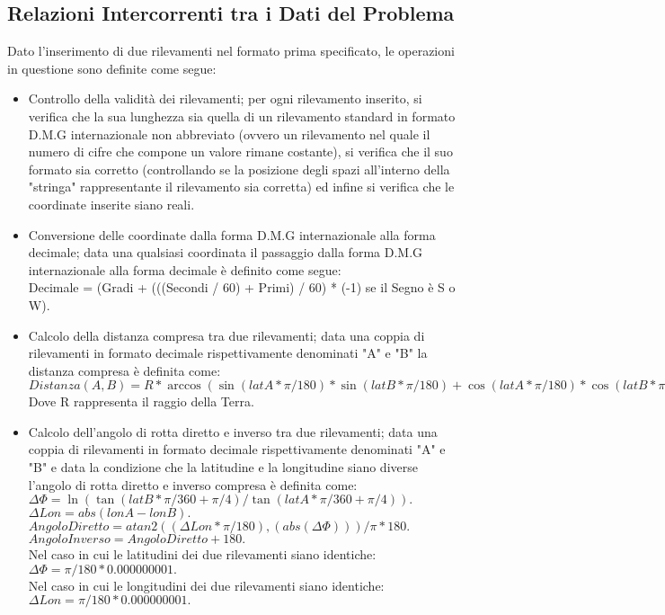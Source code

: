 \documentclass{article}
\begin{document}
\subsection{Relazioni Intercorrenti tra i Dati del Problema}
Dato l'inserimento di due rilevamenti nel formato prima specificato, le operazioni in questione sono definite come segue:
\begin{itemize}
	\item Controllo della validità dei rilevamenti; per ogni rilevamento inserito, si verifica che la sua lunghezza sia quella di un rilevamento standard in formato D.M.G internazionale non abbreviato (ovvero un rilevamento nel quale il numero di cifre che compone un valore rimane costante), si verifica che il suo formato sia corretto (controllando se la posizione degli spazi all'interno della "stringa" rappresentante il rilevamento sia corretta) ed infine si verifica che le coordinate inserite siano reali. 
	
	\item Conversione delle coordinate dalla forma D.M.G internazionale alla forma decimale; data una qualsiasi coordinata il passaggio dalla forma D.M.G internazionale alla forma decimale è definito come segue: \\
	Decimale = (Gradi + (((Secondi / 60) + Primi) / 60) * (-1) se il Segno è  S o W).
	
	\item Calcolo della distanza compresa tra due rilevamenti;  data una coppia di rilevamenti in formato decimale rispettivamente denominati "A" e "B" la distanza compresa è definita come: \\
	$Distanza(A, B) = R * \arccos(\sin(latA * \pi / 180) * \sin(latB * \pi / 180) + \cos(latA * \pi / 180) * \cos(latB * \pi / 180) * \cos((lonA - lonB) * \pi / 180)). $\\
	Dove R rappresenta il raggio della Terra.
	
	\item Calcolo dell'angolo di rotta diretto e inverso tra due rilevamenti; data una coppia di rilevamenti in formato decimale rispettivamente denominati "A" e "B" e data la condizione che la latitudine e la longitudine siano diverse l'angolo di rotta diretto e inverso compresa è definita come: \\
	$\Delta\Phi = \ln( \tan(latB * \pi / 360 + \pi / 4 ) / \tan(latA * \pi / 360 + \pi / 4 )). $\\
	$ \Delta Lon = abs(lonA - lonB). $ \\
	$ Angolo Diretto = atan2((\Delta Lon * \pi / 180), (abs(\Delta\Phi))) / \pi * 180. $\\
	$ Angolo Inverso = Angolo Diretto + 180.$\\
	Nel caso in cui le latitudini dei due rilevamenti siano identiche:\\
	$\Delta\Phi = \pi / 180 * 0.000000001.$\\
	Nel caso in cui le longitudini dei due rilevamenti siano identiche:\\
	$\Delta Lon = \pi / 180 * 0.000000001.$\\
\end{itemize}
\newpage
\end{document}
